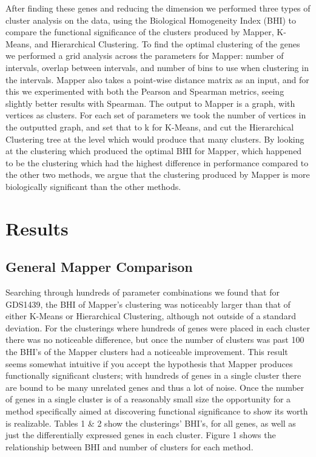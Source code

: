 \documentclass[preprint,10pt]{elsarticle}
\begin{document}
	After finding these genes and reducing the dimension we performed three types of cluster analysis on the data, using the Biological Homogeneity Index (BHI) to compare the functional significance of the clusters produced by Mapper, K-Means, and Hierarchical Clustering. To find the optimal clustering of the genes we performed a grid analysis across the parameters for Mapper: number of intervals, overlap between intervals, and number of bins to use when clustering in the intervals. Mapper also takes a point-wise distance matrix as an input, and for this we experimented with both the Pearson and Spearman metrics, seeing slightly better results with Spearman. The output to Mapper is a graph, with vertices as clusters. For each set of parameters we took the number of vertices in the outputted graph, and set that to k for K-Means, and cut the Hierarchical Clustering tree at the level which would produce that many clusters. By looking at the clustering which produced the optimal BHI for Mapper, which happened to be the clustering which had the highest difference in performance compared to the other two methods, we argue that the clustering produced by Mapper is more biologically significant than the other methods.


\section{Results}


\subsection{General Mapper Comparison}
	Searching through hundreds of parameter combinations we found that for GDS1439, the BHI of Mapper's clustering was noticeably larger than that of either K-Means or Hierarchical Clustering, although not outside of a standard deviation. For the clusterings where hundreds of genes were placed in each cluster there was no noticeable difference, but once the number of clusters was past 100 the BHI's of the Mapper clusters had a noticeable improvement. This result seems somewhat intuitive if you accept the hypothesis that Mapper produces functionally significant clusters; with hundreds of genes in a single cluster there are bound to be many unrelated genes and thus a lot of noise. Once the number of genes in a single cluster is of a reasonably small size the opportunity for a method specifically aimed at discovering functional significance to show its worth is realizable. Tables 1 \& 2 show the clusterings' BHI's, for all genes, as well as just the differentially expressed genes in each cluster. Figure 1 shows the relationship between BHI and number of clusters for each method.	
	
\end{document}

